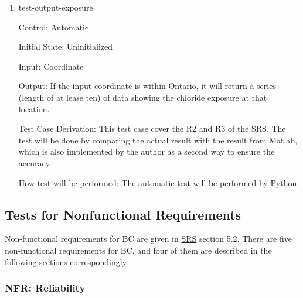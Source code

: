 \documentclass[12pt, titlepage]{article}
\begin{document}
\begin{enumerate}

\item{test-output-exposure\\}

Control: Automatic
					
Initial State: Uninitialized
					
Input: Coordinate
					
Output: If the input coordinate is within Ontario, it will return a series (length of at lease ten) of data showing the chloride exposure at that location.

Test Case Derivation: This test case cover the R2 and R3 of the SRS. The test will be done by comparing the actual result with the result from Matlab, which is also implemented by the author as a second way to ensure the accuracy.

					
How test will be performed: The automatic test will be performed by Python.

\end{enumerate}


\subsection{Tests for Nonfunctional Requirements}\label{TNR}

Non-functional requirements for BC are given in \href{https://github.com/CynthiaLiu0805/BridgeCorrosion/blob/main/docs/SRS/SRS.pdf}{SRS} section 5.2. There are five non-functional requirements for BC, and four of them are described in the following sections correspondingly.



\subsubsection{NFR: Reliability}\label{t_reliability}
		
\end{document}

